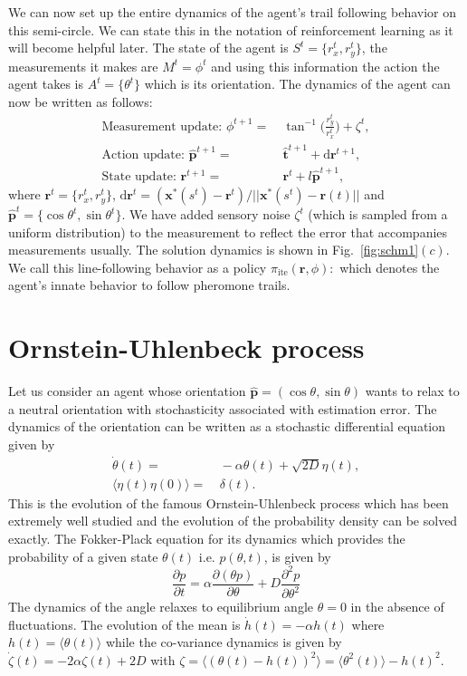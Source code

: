 \documentclass[12pt]{article}
\def\d{\text{d}}
\def\r{\mathbf{r}}
\def\xst{\mathbf{x}^*}
\def\th{\hat{\mathbf{t}}}
\def\ph{\hat{\mathbf{p}}}
\def\ite{\text{ite}}
\begin{document}
We can now set up the entire dynamics of the agent's trail following behavior on this semi-circle. We can state this
in the notation of reinforcement learning as it will become helpful later. The state of the agent
is $S^t = \{ r_x^t, r_y^t \}$, the measurements it makes are $M^t = \phi^t$ and using this information
the action the agent takes is $A^t = \{ \theta^t \}$ which is its orientation. The dynamics of
the agent can now be written as follows:
\begin{align}
    \text{Measurement update: } \phi^{t+1} = & \ \tan^{-1} \bigg( \frac{r_y^t}{r_x^t} \bigg) + \zeta^t, \\
    \text{Action update: }\ph^{t+1} =& \ \th^{t+1} + \d\r^{t+1}, \\
    \text{State update: } \r^{t+1} =& \ \r^t + l \ph^{t+1},
\end{align}
where $\r^t = \{ r_x^t, r_y^t \}$, $\d\r^t = (\xst(s^t)-\r^t)/||\xst(s^t)-\r(t)||$ and $\ph^t = \{ \cos \theta^t, \sin \theta^t \}$.
We have added sensory noise $\zeta^t$ (which is sampled from a uniform distribution) to the measurement
to reflect the error that accompanies measurements usually. The solution dynamics is shown
in Fig.~\ref{fig:schm1}$(c)$. We call this line-following behavior as a policy
$\pi_\ite(\r, \phi): $
which denotes the agent's innate behavior to follow pheromone trails.

\section{Ornstein-Uhlenbeck process}

Let us consider an agent whose orientation $\ph = ( \cos \theta, \sin \theta)$ wants to relax to a
neutral orientation with stochasticity associated with estimation error. The dynamics of the orientation
can be written as a stochastic differential equation given by
\begin{align}
    \dot{\theta}(t) =& \ - \alpha \theta(t) + \sqrt{2 D} \eta(t), \\
    \langle \eta(t) \eta(0) \rangle =& \ \delta(t).
\end{align}
This is the evolution of the famous Ornstein-Uhlenbeck process which has been extremely well studied
and the evolution of the probability density can be solved exactly. The Fokker-Plack equation for
its dynamics which provides the probability of a given state $\theta(t)$ i.e. $p(\theta, t)$, is given by
\[
    \frac{\partial p}{\partial t} = \alpha \frac{\partial(\theta p)}{\partial \theta }
    + D \frac{\partial^2 p}{\partial \theta^2}
\]
The dynamics of the angle relaxes to equilibrium angle $\theta = 0$ in the absence of fluctuations.
The evolution of the mean is $\dot{h}(t) = - \alpha h(t)$ where $h(t) = \langle \theta(t) \rangle$
while the co-variance dynamics is given by $\dot{\zeta}(t) = -2\alpha \zeta(t) + 2D$ with
$\zeta = \langle {(\theta(t) - h(t))}^2 \rangle = \langle \theta^2(t) \rangle - h{(t)}^2$.
\end{document}
